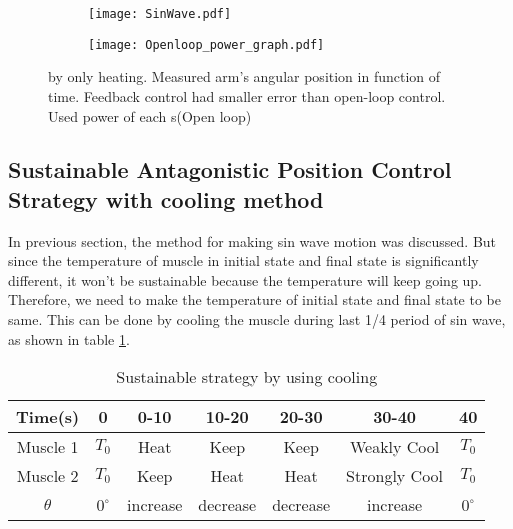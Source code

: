 
\begin{figure}[t]
	\centering
	\begin{subfigure}[t]{0.44\textwidth}
		\texttt{[image: SinWave.pdf]}
		\caption{\label{positionControl_sin}}
	\end{subfigure}%
	\begin{subfigure}[t]{0.50\textwidth}
		\texttt{[image: Openloop\_power\_graph.pdf]}
		\caption{\label{positionControl_sin_power}}
	\end{subfigure}
	\caption[\APC by only heating]{\APC by only heating.  Measured arm's angular position in function of time. Feedback control had smaller error than open-loop control.  Used power of each \scpnospace s(Open loop)}
	\label{positionControl}
\end{figure}



\clearpage



\subsection{Sustainable Antagonistic Position Control Strategy with cooling method}\label{section_simulation}
In previous section, the method for making sin wave motion was discussed. But since the temperature of muscle in initial state and final state is significantly different, it won't be sustainable because the temperature will keep going up. Therefore, we need to make the temperature of initial state and final state to be same. This can be done by cooling the muscle during last 1/4 period of sin wave, as shown in table \ref{table_apc_sustain}.

\begin{table}[b]
	\caption{Sustainable \Apc strategy by using cooling}
	\label{table_apc_sustain}
	\begin{center}
		\begin{tabular}{c||c|c|c|c|c|c}
			\hline
			Time(s) & 0 & 0-10 & 10-20 & 20-30 & 30-40 & 40 \\
			\hline
			Muscle 1 & $T_0$ & Heat & Keep & Keep & Weakly Cool & $T_0$ \\
			Muscle 2 & $T_0$ & Keep & Heat & Heat & Strongly Cool & $T_0$ \\
			\hline
			$\theta$ & $0^{\circ}$ & increase & decrease & decrease & increase & $0^{\circ}$ \\
			\hline
		\end{tabular}
	\end{center}
\end{table}

